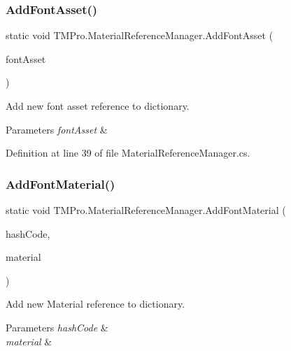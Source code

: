 \subsubsection{\texorpdfstring{AddFontAsset()}{AddFontAsset()}}
{\footnotesize\ttfamily static void T\+M\+Pro.\+Material\+Reference\+Manager.\+Add\+Font\+Asset (\begin{DoxyParamCaption}\item[{\mbox{\hyperlink{class_t_m_pro_1_1_t_m_p___font_asset}{T\+M\+P\+\_\+\+Font\+Asset}}}]{font\+Asset }\end{DoxyParamCaption})\hspace{0.3cm}{\ttfamily [static]}}



Add new font asset reference to dictionary. 


\begin{DoxyParams}{Parameters}
{\em font\+Asset} & \\
\hline
\end{DoxyParams}


Definition at line 39 of file Material\+Reference\+Manager.\+cs.

\mbox{\label{class_t_m_pro_1_1_material_reference_manager_ad32f019ea73193084d8e7f90f387b679}} 
\subsubsection{\texorpdfstring{AddFontMaterial()}{AddFontMaterial()}}
{\footnotesize\ttfamily static void T\+M\+Pro.\+Material\+Reference\+Manager.\+Add\+Font\+Material (\begin{DoxyParamCaption}\item[{int}]{hash\+Code,  }\item[{Material}]{material }\end{DoxyParamCaption})\hspace{0.3cm}{\ttfamily [static]}}



Add new Material reference to dictionary. 


\begin{DoxyParams}{Parameters}
{\em hash\+Code} & \\
\hline
{\em material} & \\
\hline
\end{DoxyParams}


